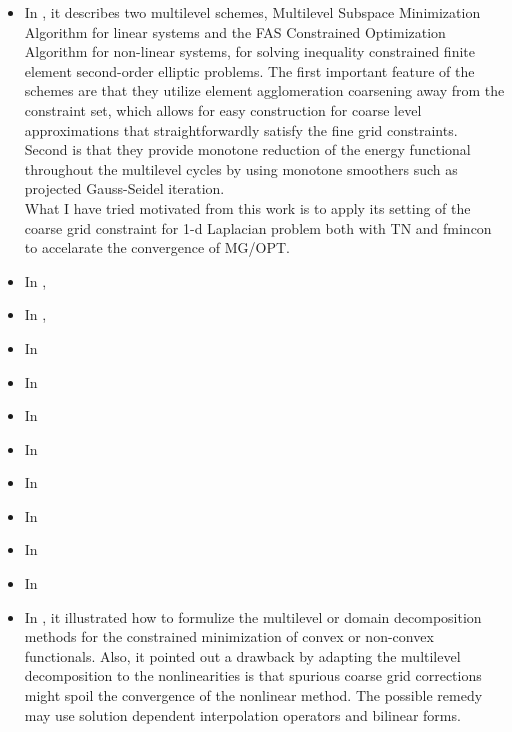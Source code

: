 \documentclass{article}
\begin{document}
\begin{itemize}
\item In \cite{ap1}, it describes two multilevel schemes, Multilevel Subspace Minimization Algorithm for linear systems and the FAS Constrained Optimization Algorithm for non-linear systems, for solving inequality constrained finite element second-order elliptic problems. The first important feature of the schemes are that they utilize element agglomeration coarsening away from the constraint set, which allows for easy construction for coarse level approximations that straightforwardly satisfy the fine grid constraints. Second is that they provide monotone reduction of the energy functional throughout the multilevel cycles by using monotone smoothers such as projected Gauss-Seidel iteration. \\

What I have tried motivated from this work is to apply its setting of the coarse grid constraint for 1-d Laplacian problem both with TN and fmincon to accelarate the convergence of MG/OPT.

\item In \cite{ma1}, 

\item In \cite{AC},

\item In \cite{TBV}

\item In \cite{JV1}

\item In \cite{RK2}

\item In \cite{RR}

\item In \cite{RR2}

\item In \cite{WH}

\item In \cite{RK3}

\item In \cite{RK4}

\item In \cite{RK}, it illustrated how to formulize the multilevel or domain decomposition methods for the constrained minimization of convex or non-convex functionals. Also, it pointed out a drawback by adapting the multilevel decomposition to the nonlinearities is that spurious coarse grid corrections might spoil the convergence of the nonlinear method. The possible remedy may use solution dependent interpolation operators and bilinear forms. 


\end{itemize}
\end{document}
